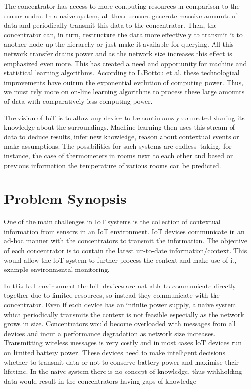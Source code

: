 \documentclass{mproj}
\begin{document}
The concentrator has access to more computing resources in comparison to the sensor nodes. In a naive system, all these sensors generate massive amounts of data and periodically transmit this data to the concentrator. Then, the concentrator can, in turn, restructure the data more effectively to transmit it to another node up the hierarchy or just make it available for querying. All this network transfer drains power and as the network size increases this effect is emphasized even more. This has created a need and opportunity for machine and statistical learning algorithms. \cite{LargeScaleOnlineLearning} According to L.Bottou et al. \cite{LargeScaleOnlineLearning} these technological improvements have outrun the exponential evolution of computing power. Thus, we must rely more on on-line learning algorithms to process these large amounts of data with comparatively less computing power.

The vision of IoT is to allow any device to be continuously connected sharing its knowledge about the surroundings. Machine learning then uses this stream of data to deduce results, infer new knowledge, reason about contextual events or make assumptions. The possibilities for such systems are endless, taking, for instance, the case of thermometers in rooms next to each other and based on previous information the temperature of various rooms can be predicted.

\section{Problem Synopsis}
One of the main challenges in IoT systems is the collection of contextual information from sensors in an IoT environment. \cite{intelligentContextualInformation} IoT devices communicate in an ad-hoc manner with the concentrators to transmit the information. The objective of each concentrator is to contain the latest up-to-date information/context. This would allow the IoT system to further process the context and make use of it, example environmental monitoring.

In this IoT environment the IoT devices are not able to communicate directly together due to limited resources, so instead they communicate with the concentrator. Even if each device has an infinite power supply, a naive system which periodically transmits the context is not feasible especially as the network grows in size. Concentrators would become overloaded with messages from all devices and incur a performance degradation as network size increases. Transmitting wireless messages is very costly and in most cases IoT devices run on limited battery power. These devices need to make intelligent decisions whether to transmit data or not to conserve battery power and maximise their lifetime. In the naive system there is no concept of knowledge, thus withholding data would result in the concentrators having gaps of knowledge.
\end{document}
